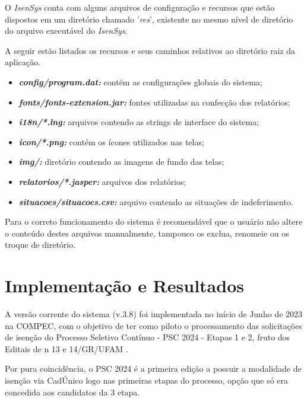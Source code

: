 \documentclass[
	12pt,			%
	openright,		%
	oneside,	
	a4paper,		%
	english,		%
	brazil			%
]{abntex2/abntex2}  %
\begin{document}
			O \textit{IsenSys} conta com alguns arquivos de configuração e recursos que estão dispostos em um diretório chamado '\textit{res}', existente no mesmo nível de diretório do arquivo executável do \textit{IsenSys}.
			
			A seguir estão listados os recursos e seus caminhos relativos ao diretório raiz da aplicação.
			
			\begin{itemize}
				
				\item \textbf{\textit{config/program.dat:}} contém as configurações globais do sistema;
				\item \textbf{\textit{fonts/fonts-extension.jar:}} fontes utilizadas na confecção dos relatórios;
				\item \textbf{\textit{i18n/*.lng:}} arquivos contendo as strings de interface do sistema;
				\item \textbf{\textit{icon/*.png:}} contém os ícones utilizados nas telas;
				\item \textbf{\textit{img/:}} diretório contendo as imagens de fundo das telas;
				\item \textbf{\textit{relatorios/*.jasper:}} arquivos dos relatórios;
				\item \textbf{\textit{situacoes/situacoes.csv:}} arquivo contendo as situações de indeferimento.
				
			\end{itemize}
			
			Para o correto funcionamento do sistema é recomendável que o usuário não altere o conteúdo destes arquivos manualmente, tampouco os exclua, renomeie ou os troque de diretório.

	\chapter{Implementação e Resultados}
	
		A versão corrente do sistema (v.3.8) foi implementada no início de Junho de 2023 na COMPEC, com o objetivo de ter como piloto o processamento das solicitações de isenção do Processo Seletivo Contínuo - PSC 2024 - Etapas 1 e 2, fruto dos Editais de n{\textdegree} 13 \cite{edital-13} e 14/GR/UFAM \cite{edital-14}.
		
		Por pura coincidência, o PSC 2024 é a primeira edição a possuir a modalidade de isenção via CadÚnico logo nas primeiras etapas do processo, opção que só era concedida aos candidatos da 3{\textordfeminine} etapa.
		
\end{document}
